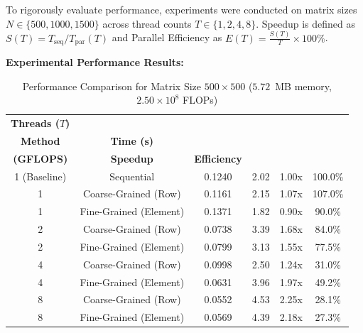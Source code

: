\documentclass[12pt]{article}
\begin{document}
To rigorously evaluate performance, experiments were conducted on matrix sizes $N \in \{500, 1000, 1500\}$ across thread counts $T \in \{1, 2, 4, 8\}$. Speedup is defined as $S(T) = T_{\text{seq}} / T_{\text{par}}(T)$ and Parallel Efficiency as $E(T) = \frac{S(T)}{T} \times 100\%$.

\vspace{0.3cm}
\textbf{Experimental Performance Results:}

\begin{table}[H]
\centering
\caption{Performance Comparison for Matrix Size $500 \times 500$ ($5.72$~MB memory, $2.50 \times 10^8$ FLOPs)}
\vspace{0.15cm}
\begin{tabular}{cccccc}
\toprule
\textbf{Threads ($T$)} & \shortstack{\textbf{Decomposition}\\\textbf{Method}} & \textbf{Time (s)} & \shortstack{\textbf{Throughput}\\\textbf{(GFLOPS)}} & \textbf{Speedup} & \textbf{Efficiency} \\
\midrule
1 (Baseline) & Sequential & 0.1240 & 2.02 & 1.00x & 100.0\% \\
\midrule
1 & Coarse-Grained (Row) & 0.1161 & 2.15 & 1.07x & 107.0\% \\
1 & Fine-Grained (Element) & 0.1371 & 1.82 & 0.90x & 90.0\% \\
\midrule
2 & Coarse-Grained (Row) & 0.0738 & 3.39 & 1.68x & 84.0\% \\
2 & Fine-Grained (Element) & 0.0799 & 3.13 & 1.55x & 77.5\% \\
\midrule
4 & Coarse-Grained (Row) & 0.0998 & 2.50 & 1.24x & 31.0\% \\
4 & Fine-Grained (Element) & 0.0631 & 3.96 & 1.97x & 49.2\% \\
\midrule
8 & Coarse-Grained (Row) & 0.0552 & 4.53 & 2.25x & 28.1\% \\
8 & Fine-Grained (Element) & 0.0569 & 4.39 & 2.18x & 27.3\% \\
\bottomrule
\end{tabular}
\end{table}
\end{document}
